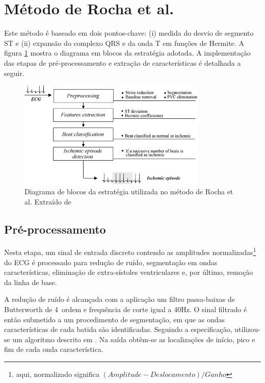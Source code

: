 
\section{Método de Rocha et al.}
\label{sec:section2}
Este método é baseado em dois pontos-chave: (i) medida do desvio de segmento ST e (ii) expansão do complexo QRS e da onda T em funções de Hermite. A figura \ref{fig:rocha_01} mostra o diagrama em blocos da estratégia adotada. A implementação das etapas de pré-processamento e extração de características é detalhada a seguir.

\begin{figure}[ht]
    \centering
    \includegraphics[width=0.8\textwidth]{figures/rocha_01.png}
    \caption{Diagrama de blocos da estratégia utilizada no método de Rocha et al. Extraído de \cite{Rocha10}}
    \label{fig:rocha_01}
\end{figure}

\subsection{Pré-processamento}
Nesta etapa, um sinal de entrada discreto contendo as amplitudes normalizadas\footnote{aqui, normalizado significa $(Amplitude - Deslocamento) / Ganho$} do ECG é processado para redução de ruído, segmentação em ondas características, eliminação de extra-sístoles ventriculares e, por último, remoção da linha de base.

A redução de ruído é alcançada com a aplicação um filtro passa-baixas de Butterworth de 4\textordfeminine\ ordem e frequência de corte igual a 40Hz. O sinal filtrado é então submetido a um procedimento de segmentação, em que as ondas características de cada batida são identificadas. Seguindo a especificação, utilizou-se um algoritmo descrito em \cite{Sun05}. Na saída obtêm-se as localizações de início, pico e fim de cada onda característica.

